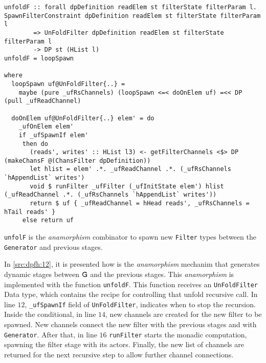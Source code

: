 \begin{listing}[H]
  \begin{verbatim}
unfoldF :: forall dpDefinition readElem st filterState filterParam l. SpawnFilterConstraint dpDefinition readElem st filterState filterParam l
        => UnFoldFilter dpDefinition readElem st filterState filterParam l 
        -> DP st (HList l) 
unfoldF = loopSpawn

where
  loopSpawn uf@UnFoldFilter{..} =
    maybe (pure _ufRsChannels) (loopSpawn <=< doOnElem uf) =<< DP (pull _ufReadChannel)

  doOnElem uf@UnFoldFilter{..} elem' = do
    _ufOnElem elem'
    if _ufSpawnIf elem'
     then do
       (reads', writes' :: HList l3) <- getFilterChannels <$> DP (makeChansF @(ChansFilter dpDefinition))
       let hlist = elem' .*. _ufReadChannel .*. (_ufRsChannels `hAppendList` writes')
       void $ runFilter _ufFilter (_ufInitState elem') hlist (_ufReadChannel .*. (_ufRsChannels `hAppendList` writes'))
       return $ uf { _ufReadChannel = hHead reads', _ufRsChannels = hTail reads' }
     else return uf

  \end{verbatim}
  \caption[{[\texttt{Stage.hs}] unfoldF}]{\texttt{unfolF} is the \emph{anamorphism} combinator to spawn new \texttt{Filter} types between the \texttt{Generator} and previous stages.}
  \label{src:dpfh:12}
\end{listing}

In \autoref{src:dpfh:12}, it is presented how is the \emph{anamorphism} mechanim that generates dynamic stages between $\mathsf{G}$ and the previous stages.
This \emph{anamorphism} is implemented with the function \texttt{unfoldF}. This function receives an \texttt{UnFoldFilter} Data type, which contains the recipe for controlling that unfold recursive call. 
In line $12$, \texttt{_ufSpawnIf} field of \texttt{UnFoldFilter}, indicates when to stop the recursion. 
Inside the conditional, in line $14$, new channels are created for the new filter to be spawned. New channels connect the new filter with the previous stages and with \texttt{Generator}. 
After that, in line $16$ \texttt{runFilter} starts the monadic computation, spawning the filter stage with its actors.
Finally, the new list of channels are returned for the next recursive step to allow further channel connections.

